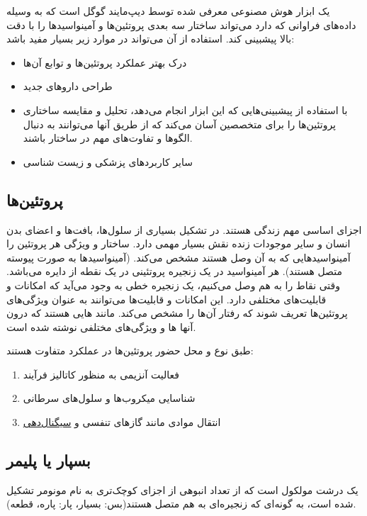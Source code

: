 \documentclass[10pt, a4paper]{article}
\begin{document}
یک ابزار هوش مصنوعی معرفی شده توسط دیپ‌مایند گوگل است که به وسیله داده‌های
فراوانی که دارد می‌تواند ساختار سه بعدی پروتئین‌ها و آمینواسید‌ها را با دقت بالا
پیشبینی کند. استفاده از آن می‌تواند در موارد زیر بسیار مفید باشد:

\begin{itemize}
    \item درک بهتر عملکرد پروتئین‌ها و توابع آن‌ها
    \item طراحی دارو‌های جدید
    \item با استفاده از پیشبینی‌هایی که این ابزار انجام می‌دهد، تحلیل و مقایسه
    ساختاری پروتئین‌ها را برای متخصصین آسان می‌کند که از طریق آنها می‌توانند به
    دنبال الگو‌ها و تفاوت‌های مهم در ساختار باشند.
    \item سایر کاربرد‌های پزشکی و زیست شناسی 
\end{itemize}

\subsection{پروتئین‌ها}

اجزای اساسی مهم زندگی هستند. در تشکیل بسیاری از سلول‌ها، بافت‌ها و اعضای بدن
انسان و سایر موجودات زنده نقش بسیار مهمی دارد. ساختار و ویژگی هر پروتئین را
آمینواسید‌هایی که به آن وصل هستند مشخص می‌کند. (آمینواسید‌ها به صورت پیوسته متصل
هستند). هر آمینواسید در یک زنجیره پروتئینی در یک نقطه از دایره می‌باشد. وقتی
نقاط را به هم وصل می‌کنیم، یک زنجیره خطی به وجود می‌آید که امکانات و قابلیت‌های
مختلفی دارد. این امکانات و قابلیت‌ها می‌توانند به عنوان ویژگی‌های پروتئین‌ها
تعریف شوند که رفتار آن‌ها را مشخص می‌کند. مانند هایی هستند که درون
آنها ها و ویژگی‌های مختلفی نوشته شده است.

طبق نوع و محل حضور پروتئین‌ها در عملکرد متفاوت هستند:

\begin{enumerate}
    \item فعالیت آنزیمی به منظور کاتالیز فرآیند
    \item شناسایی میکروب‌ها و سلول‌های سرطانی
    \item انتقال موادی مانند گاز‌های تنفسی و \underline{سیگنال‌دهی}
\end{enumerate}

\subsection{بسپار یا پلیمر}

یک درشت مولکول است که از تعداد انبوهی از اجزای کوچک‌تری به نام مونومر تشکیل شده
است، به گونه‌ای که زنجیره‌ای به هم متصل هستند(بس: بسیار، پار: پاره، قطعه).
\end{document}
